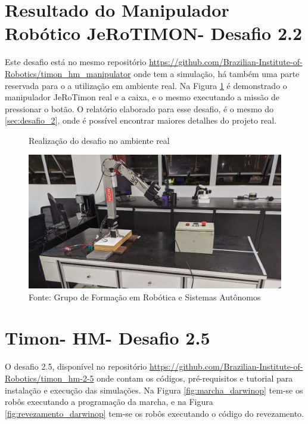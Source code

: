 \section{Resultado do Manipulador Robótico JeRoTIMON- Desafio 2.2 }
\label{sec:desafio_2_2}
Este desafio está no mesmo repositório \url{https://github.com/Brazilian-Institute-of-Robotics/timon\_hm\_manipulator} onde tem a simulação, há também uma parte reservada para o a utilização em ambiente real. Na Figura \ref{fig:manipulador_real} é demonstrado o manipulador JeRoTimon real e a caixa, e o mesmo executando a missão de pressionar o botão. O relatório elaborado para esse desafio, é o mesmo do \ref{sec:desafio_2}, onde é possível encontrar maiores detalhes do projeto real.



\begin{figure}[H]
    \caption{Realização do desafio no ambiente real}
    \centering
    \includegraphics[width= \textwidth]{Figures/manipulador_real.png}
    \caption*{Fonte: Grupo de Formação em Robótica e Sistemas Autônomos}
    \label{fig:manipulador_real}
\end{figure}



\section{Timon- HM- Desafio 2.5}
\label{sec:desafio_2_5}
O desafio 2.5, disponível no repositório \url{https://github.com/Brazilian-Institute-of-Robotics/timon_hm-2-5} onde contam os códigos, pré-requisitos e tutorial para instalação e execução das simulações. Na Figura \ref{fig:marcha_darwinop} tem-se os robôs executando a programação da marcha, e na Figura \ref{fig:revezamento_darwinop} tem-se os robôs executando o código do revezamento.



